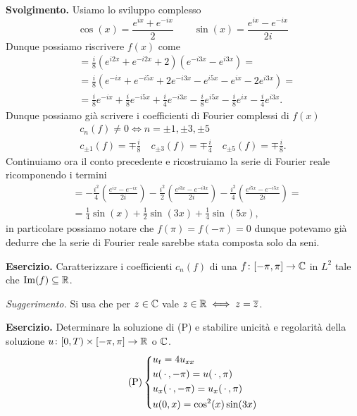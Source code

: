 \textbf{Svolgimento.}
Usiamo lo sviluppo complesso
$$
\cos(x) = \frac{e^{ix} + e^{-ix}}{2}
\qquad
\sin(x) = \frac{e^{ix} - e^{-ix}}{2i}
$$
Dunque possiamo riscrivere $f(x)$ come
$$
\begin{aligned}
	&= \frac{i}{8} \left( e^{i2x} + e^{-i2x} + 2 \right) \left( e^{-i3x} - e^{i3x} \right) = \\
	&= \frac{i}{8} \left( e^{-ix} + e^{-i5x} + 2e^{-i3x} - e^{i5x} - e^{ix} - 2e^{i3x} \right) = \\
	&= \frac{i}{8} e^{-ix} + \frac{i}{8} e^{-i5x} + \frac{i}{4} e^{-i3x} - \frac{i}{8} e^{i5x} - \frac{i}{8} e^{ix} - \frac{i}{4} e^{i3x}. 
\end{aligned}
$$
Dunque possiamo già scrivere i coefficienti di Fourier complessi di $f(x)$
$$
\begin{gathered}
	c_n(f) \neq 0 \iff n = \pm 1, \pm 3, \pm 5 \\
	c_{\pm 1}(f) = \mp\frac{i}{8}  
	\quad
	c_{\pm 3}(f) = \mp\frac{i}{4}
	\quad
	c_{\pm 5}(f) = \mp\frac{i}{8}.
\end{gathered}
$$
Continuiamo ora il conto precedente e ricostruiamo la serie di Fourier reale ricomponendo i termini
$$
\begin{aligned}
	&= -\frac{i^2}{4}\left( \frac{e^{ix} - e^{-ix}}{2i} \right) -\frac{i^2}{2}\left( \frac{e^{i3x} - e^{-i3x}}{2i} \right) -\frac{i^2}{4}\left( \frac{e^{i5x} - e^{-i5x}}{2i} \right) = \\
	&= \frac{1}{4} \sin(x) + \frac{1}{2} \sin(3x) + \frac{1}{4} \sin(5x),
\end{aligned}
$$
in particolare possiamo notare che $f(\pi) = f(-\pi) = 0$ dunque potevamo già dedurre che la serie di Fourier reale sarebbe stata composta solo da seni.

\textbf{Esercizio.}
Caratterizzare i coefficienti $c_n(f)$ di una $f \colon [-\pi, \pi] \to \mathbb C$ in $L^2$ tale che $\operatorname{Im}(f) \subseteq \mathbb R$.

\textit{Suggerimento.} Si usa che per $z \in \mathbb C$ vale $z \in \mathbb R \iff z = \overline z$.

\textbf{Esercizio.}
Determinare la soluzione di (P) e stabilire unicità e regolarità della soluzione $u \colon [0, T) \times [-\pi, \pi] \to \mathbb R$ o $\mathbb C$.
\begin{equation}
	\tag{P}
	\left\{
	\begin{aligned}
		& u_t = 4 u_{xx} \\
		& u(\,\cdot\,, -\pi) = u(\,\cdot\,, \pi) \\
		& u_x(\,\cdot\,, -\pi) = u_x(\,\cdot\,, \pi) \\
		& u(0, x) = \cos^2(x) \sin(3x)
	\end{aligned}
	\right.
\end{equation}

